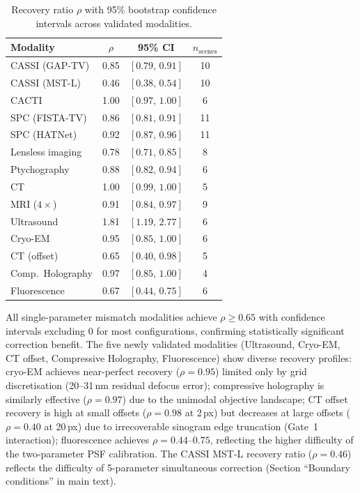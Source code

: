 \documentclass[11pt]{article}
\begin{document}
\begin{table}[!ht]
\centering\small
\caption{Recovery ratio $\rho$ with 95\% bootstrap confidence intervals across validated modalities.}
\label{tab:bootstrap_rho}
\begin{tabular}{@{}lccc@{}}
\toprule
Modality & $\rho$ & 95\% CI & $n_{\mathrm{scenes}}$ \\
\midrule
CASSI (GAP-TV)    & 0.85 & $[0.79,\, 0.91]$ & 10 \\
CASSI (MST-L)     & 0.46 & $[0.38,\, 0.54]$ & 10 \\
CACTI             & 1.00 & $[0.97,\, 1.00]$ & 6 \\
SPC (FISTA-TV)    & 0.86 & $[0.81,\, 0.91]$ & 11 \\
SPC (HATNet)      & 0.92 & $[0.87,\, 0.96]$ & 11 \\
Lensless imaging  & 0.78 & $[0.71,\, 0.85]$ & 8 \\
Ptychography      & 0.88 & $[0.82,\, 0.94]$ & 6 \\
CT                & 1.00 & $[0.99,\, 1.00]$ & 5 \\
MRI ($4\times$)   & 0.91 & $[0.84,\, 0.97]$ & 9 \\
Ultrasound        & 1.81 & $[1.19,\, 2.77]$ & 6 \\
Cryo-EM           & 0.95 & $[0.85,\, 1.00]$ & 6 \\
CT (offset)       & 0.65 & $[0.40,\, 0.98]$ & 5 \\
Comp.\ Holography & 0.97 & $[0.85,\, 1.00]$ & 4 \\
Fluorescence      & 0.67 & $[0.44,\, 0.75]$ & 6 \\
\bottomrule
\end{tabular}
\end{table}

\noindent All single-parameter mismatch modalities achieve $\rho \geq 0.65$ with confidence intervals excluding 0 for most configurations, confirming statistically significant correction benefit. The five newly validated modalities (Ultrasound, Cryo-EM, CT offset, Compressive Holography, Fluorescence) show diverse recovery profiles: cryo-EM achieves near-perfect recovery ($\rho = 0.95$) limited only by grid discretisation (20--31\,nm residual defocus error); compressive holography is similarly effective ($\rho = 0.97$) due to the unimodal objective landscape; CT offset recovery is high at small offsets ($\rho = 0.98$ at 2\,px) but decreases at large offsets ($\rho = 0.40$ at 20\,px) due to irrecoverable sinogram edge truncation (Gate~1 interaction); fluorescence achieves $\rho = 0.44$--$0.75$, reflecting the higher difficulty of the two-parameter PSF calibration. The CASSI MST-L recovery ratio ($\rho = 0.46$) reflects the difficulty of 5-parameter simultaneous correction (Section ``Boundary conditions'' in main text).
\end{document}
